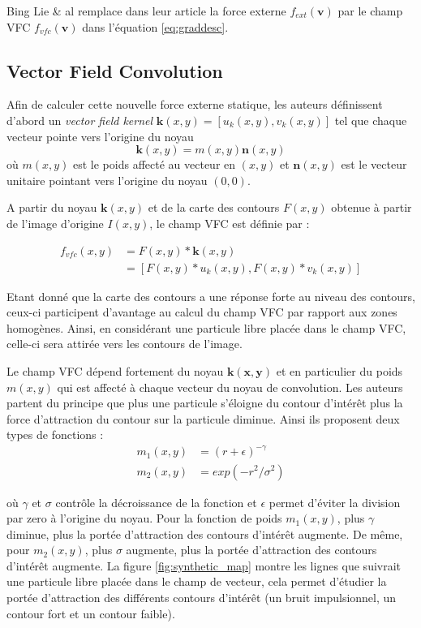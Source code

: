 \documentclass{article}
\begin{document}
Bing Lie \& al remplace dans leur article la force externe $f_{ext}(\mathbf{v})$ par le champ VFC $f_{vfc}(\mathbf{v})$ dans l'équation \ref{eq:graddesc}.

\subsection{Vector Field Convolution}

Afin de calculer cette nouvelle force externe statique, les auteurs définissent d'abord un \textit{vector field kernel} $\mathbf{k}(x,y)=[u_k(x,y),v_k(x,y)]$ tel que chaque vecteur pointe vers l'origine du noyau 
\begin{equation}
	\mathbf{k}(x,y)=m(x,y)\mathbf{n}(x,y)
\end{equation}
où $m(x,y)$ est le poids affecté au vecteur en $(x,y)$ et $\mathbf{n}(x,y)$ est le vecteur unitaire pointant vers l'origine du noyau $(0,0)$.

A partir du noyau $\mathbf{k}(x,y)$ et de la carte des contours $F(x,y)$ obtenue à partir de l'image d'origine $I(x,y)$, le champ VFC est définie par :

\begin{align*}
	f_{vfc}(x,y) & = F(x,y)*\mathbf{k}(x,y) \\
				 & = [F(x,y)*u_k(x,y),F(x,y)*v_k(x,y)]
\end{align*}

Etant donné que la carte des contours a une réponse forte au niveau des contours, ceux-ci participent d'avantage au calcul du champ VFC par rapport aux zones homogènes. Ainsi, en considérant une particule libre placée dans le champ VFC, celle-ci sera attirée vers les contours de l'image. 

Le champ VFC dépend fortement du noyau $\mathbf{k(x,y)}$ et en particulier du poids $m(x,y)$ qui est affecté à chaque vecteur du noyau de convolution. Les auteurs partent du principe que plus une particule s'éloigne du contour d'intérêt plus la force d'attraction du contour sur la particule diminue. Ainsi ils proposent deux types de fonctions :
\begin{align}
	m_1(x,y) & = (r+\epsilon)^{-\gamma} \\
	m_2(x,y) & = exp(-r^2/\sigma^2)
\end{align}

où $\gamma$ et $\sigma$ contrôle la décroissance de la fonction et $\epsilon$ permet d'éviter la division par zero à l'origine du noyau. Pour la fonction de poids $m_1(x,y)$, plus $\gamma$ diminue, plus la portée d'attraction des contours d'intérêt augmente. De même, pour $m_2(x,y)$, plus $\sigma$ augmente, plus la portée d'attraction des contours d'intérêt augmente. La figure \ref{fig:synthetic_map} montre les lignes que suivrait une particule libre placée dans le champ de vecteur, cela permet d'étudier la portée d'attraction des différents contours d'intérêt (un bruit impulsionnel, un contour fort et un contour faible).
\end{document}
